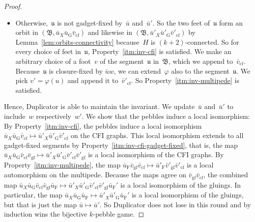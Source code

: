 \documentclass[]{lmcs}
\renewcommand{\phi}{\varphi}
\newcommand{\autoA}{\phi}
\newcommand{\tup}[1]{\bar{#1}}
\newcommand{\vertA}{u}
\newcommand{\vertB}{v}
\newcommand{\vertC}{w}
\newcommand{\StructB}{\mathfrak{B}}
\newcommand{\bVertA}{\mathfrak{u}}
\newcommand{\footbsetA}{X}
\newcommand{\feetrestrict}[2]{#1_{#2}}
\newcommand{\gadgetrestrict}[1]{#1_{\text{G}}}
\newcommand{\nongadgetrestrict}[1]{#1_{\text{F}}}
\newcommand{\gadgetfixed}[1]{#1_{\text{gf}}}
\newcommand{\closurefixed}[1]{#1_{\text{cf}}}
\begin{document}
\begin{proof}
\begin{enumerate}[label=(\alph*)]
\begin{itemize}
		\item Otherwise,~$\bVertA$ is not gadget-fixed by~$\tup{\vertA}$ and~$\tup{\vertA}'$.
		So the two feet of~$\bVertA$ form an orbit in
		$(\StructB, \feetrestrict{\tup{\vertA}}{\footbsetA}\gadgetrestrict{\tup{\vertA}}\closurefixed{\tup{\vertB}})$
		and likewise in $(\StructB, \feetrestrict{\tup{\vertA}'}{\footbsetA}\gadgetrestrict{\tup{\vertA}'}\closurefixed{\tup{\vertB}'})$
		by Lemma~\ref{lem:orbits-connectivity}
		because~$H$ is $(k+2)$-connected.
		So for every choice of feet in~$\bVertA$,
		Property~\ref{itm:inv-cfi} is satisfied.
		We make an arbitrary choice of a foot~$\vertB$ of the segment~$\bVertA$ in~$\StructB$,
		which we append to~$\closurefixed{\tup{\vertB}}$.
		Because~$\bVertA$ is closure-fixed by $\tup{\vertA}\vertC$,
		we can extend~$\autoA$
		also to the segment~$\bVertA$.
		We pick $\vertB' = \autoA(\vertA)$
		and append it to~$\closurefixed{\tup{\vertB}'}$.
		So Property~\ref{itm:inv-multipede} is satisfied.
		\end{itemize}
	\end{enumerate}
	Hence, Duplicator is able to maintain the invariant.
	We update~$\tup{\vertA}$ and~$\tup{\vertA}'$
	to include~$\vertC$ respectively~$\vertC'$.
	We show that the pebbles induce a local isomorphism:
	By Property~\ref{itm:inv-cfi},
	the pebbles induce a local isomorphism
	$\feetrestrict{\tup{\vertA}}{\footbsetA}\gadgetrestrict{\tup{\vertA}}\closurefixed{\tup{\vertB}} \mapsto \feetrestrict{\tup{\vertA}'}{\footbsetA}\gadgetrestrict{\tup{\vertA}'}\closurefixed{\tup{\vertB}'}$  on the CFI graphs.
	This local isomorphism extends to all gadget-fixed segments
	by Property~\ref{itm:inv-cfi-gadget-fixed},
	that is, the map $\feetrestrict{\tup{\vertA}}{\footbsetA}\gadgetrestrict{\tup{\vertA}}\closurefixed{\tup{\vertB}}\gadgetfixed{\tup{\vertB}} \mapsto \feetrestrict{\tup{\vertA}'}{\footbsetA}\gadgetrestrict{\tup{\vertA}'}\closurefixed{\tup{\vertB}'}\gadgetfixed{\tup{\vertB}'}$
	is a local isomorphism of the CFI graphs.
	By Property~\ref{itm:inv-multipede},
	the map
	$\nongadgetrestrict{\tup{\vertA}}\gadgetfixed{\tup{\vertB}}\closurefixed{\tup{\vertB}} \mapsto \nongadgetrestrict{\tup{\vertA}'}\gadgetfixed{\tup{\vertB}'}\closurefixed{\tup{\vertB}'}$
	is a local automorphism on the multipede.
	Because the maps agree on $\gadgetfixed{\tup{\vertB}}\closurefixed{\tup{\vertB}}$,
	the combined map 
	$\feetrestrict{\tup{\vertA}}{\footbsetA}\gadgetrestrict{\tup{\vertA}}\closurefixed{\tup{\vertB}}\gadgetfixed{\tup{\vertB}}\nongadgetrestrict{\tup{\vertA}} \mapsto \feetrestrict{\tup{\vertA}'}{\footbsetA}\gadgetrestrict{\tup{\vertA}'}\closurefixed{\tup{\vertB}'}\gadgetfixed{\tup{\vertB}'}\nongadgetrestrict{\tup{\vertA}}'$
	is a local isomorphism of the gluings.
	In particular, the map 	$\feetrestrict{\tup{\vertA}}{\footbsetA}\gadgetrestrict{\tup{\vertA}}\nongadgetrestrict{\tup{\vertA}} \mapsto \feetrestrict{\tup{\vertA}'}{\footbsetA}\gadgetrestrict{\tup{\vertA}'}\nongadgetrestrict{\tup{\vertA}}'$
	is a local isomorphism of the gluings,
	but that is just the map $\tup{\vertA} \mapsto \tup{\vertA}'$.
	So 	Duplicator does not lose in this round
	and by induction wins the bijective $k$-pebble game.
\end{proof}
\end{document}
